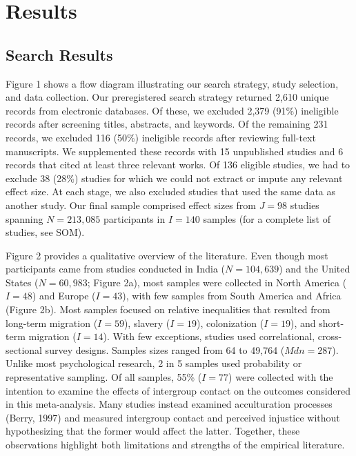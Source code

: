 \documentclass[12pt, letterpaper]{article}
\begin{document}
\hypertarget{results}{%
\section{Results}\label{results}}

\hypertarget{search-results}{%
\subsection{Search Results}\label{search-results}}

Figure 1 shows a flow diagram illustrating our search strategy, study
selection, and data collection. Our preregistered search strategy
returned 2,610 unique records from electronic databases. Of these, we
excluded 2,379 (91\%) ineligible records after screening titles,
abstracts, and keywords. Of the remaining 231 records, we excluded 116
(50\%) ineligible records after reviewing full-text manuscripts. We
supplemented these records with 15 unpublished studies and 6 records
that cited at least three relevant works. Of 136 eligible studies, we
had to exclude 38 (28\%) studies for which we could not extract or
impute any relevant effect size. At each stage, we also excluded studies
that used the same data as another study. Our final sample comprised
effect sizes from \(J = 98\) studies spanning \(N = 213,085\)
participants in \(I = 140\) samples (for a complete list of studies, see
SOM).

Figure 2 provides a qualitative overview of the literature. Even though
most participants came from studies conducted in India (\(N = 104,639\))
and the United States (\(N = 60,983\); Figure 2a), most samples were
collected in North America (\(I = 48\)) and Europe (\(I = 43\)), with
few samples from South America and Africa (Figure 2b). Most samples
focused on relative inequalities that resulted from long-term migration
(\(I = 59\)), slavery (\(I = 19\)), colonization (\(I = 19\)), and
short-term migration (\(I = 14\)). With few exceptions, studies used
correlational, cross-sectional survey designs. Samples sizes ranged from
64 to 49,764 (\(\textit{Mdn} = 287\)). Unlike most psychological
research, 2 in 5 samples used probability or representative sampling. Of
all samples, 55\% (\(I = 77\)) were collected with the intention to
examine the effects of intergroup contact on the outcomes considered in
this meta-analysis. Many studies instead examined acculturation
processes (Berry, 1997) and measured intergroup contact and perceived
injustice without hypothesizing that the former would affect the latter.
Together, these observations highlight both limitations and strengths of
the empirical literature.
\end{document}
